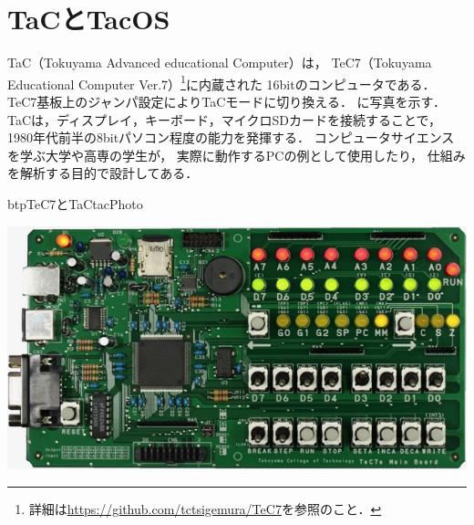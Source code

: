 \chapter{TaCとTacOS}
\label{TacAndTacOS}
TaC（Tokuyama Advanced educational Computer）は，
TeC7（Tokuyama Educational Computer Ver.7）\footnote{
  詳細は\url{https://github.com/tctsigemura/TeC7}を参照のこと．}に内蔵された
16bitのコンピュータである．
TeC7基板上のジャンパ設定によりTaCモードに切り換える．
に写真を示す．
TaCは，ディスプレイ，キーボード，マイクロSDカードを接続することで，
1980年代前半の8bitパソコン程度の能力を発揮する．
コンピュータサイエンスを学ぶ大学や高専の学生が，
実際に動作するPCの例として使用したり，
仕組みを解析する目的で設計してある．

\begin{myfig}{btp}{TeC7とTaC}{tacPhoto}
  \begin{minipage}{0.58\columnwidth}
    \begin{center}
      \includegraphics[scale=0.35]{Photo/TeC7.jpg}\\
      \label{fig:tec7Photo}
    \end{center}
  \end{minipage}
  \begin{minipage}{0.38\columnwidth}
    \begin{center}

\end{center}
\end{minipage}
\end{myfig}
